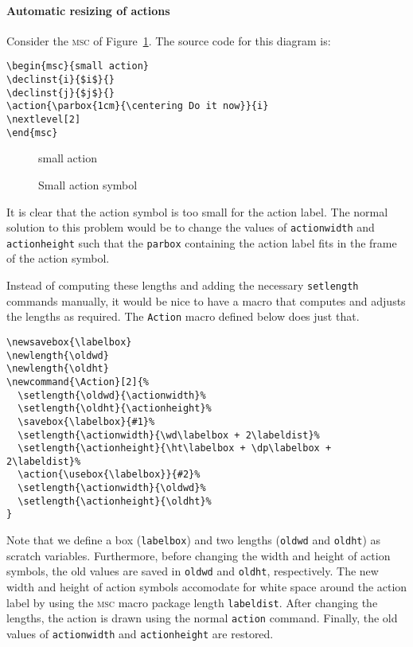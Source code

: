 \documentclass[a4paper]{article}
\newcommand{\cmd}[1]{\texttt{\bslash #1}}
\newcommand{\acro}[1]{{\scshape\lowercase{#1}}}
\newcommand\MSC{\acro{MSC}}
\newcommand{\mscpack}{\MSC{} macro package}
\begin{document}
\paragraph{Automatic resizing of actions}

Consider the \MSC{} of Figure~\ref{fig:small:action}. The source code
for this diagram is:
{
\small
\begin{verbatim}
\begin{msc}{small action}
\declinst{i}{$i$}{}
\declinst{j}{$j$}{}
\action{\parbox{1cm}{\centering Do it now}}{i}
\nextlevel[2]
\end{msc}
\end{verbatim}
}

\begin{figure}[htb]
\begin{center}
\begin{msc}{small action}
\nextlevel[2]
\end{msc}
\end{center}

\caption{Small action symbol}
\label{fig:small:action}
\end{figure}

It is clear that the action symbol is too small for the action
label. The normal solution to this problem would be to change the
values of \cmd{actionwidth} and \cmd{actionheight} such that the
\cmd{parbox} containing the action label fits in the frame of the
action symbol.

Instead of computing these lengths and adding the necessary
\cmd{setlength} commands manually, it would be nice to have a macro
that computes and adjusts the lengths as required. The \cmd{Action} macro
defined below does just that.
{
\small
\begin{verbatim}
\newsavebox{\labelbox}
\newlength{\oldwd}
\newlength{\oldht}
\newcommand{\Action}[2]{%
  \setlength{\oldwd}{\actionwidth}%
  \setlength{\oldht}{\actionheight}%
  \savebox{\labelbox}{#1}%
  \setlength{\actionwidth}{\wd\labelbox + 2\labeldist}%
  \setlength{\actionheight}{\ht\labelbox + \dp\labelbox + 2\labeldist}%
  \action{\usebox{\labelbox}}{#2}%
  \setlength{\actionwidth}{\oldwd}%
  \setlength{\actionheight}{\oldht}%
}
\end{verbatim}
} Note that we define a box (\cmd{labelbox}) and two lengths
(\cmd{oldwd} and \cmd{oldht}) as scratch variables. Furthermore,
before changing the width and height of action symbols, the old values
are saved in \cmd{oldwd} and \cmd{oldht}, respectively. The new width
and height of action symbols accomodate for white space around the
action label by using the \mscpack{} length \cmd{labeldist}.  After
changing the lengths, the action is drawn using the normal
\cmd{action} command. Finally, the old values of \cmd{actionwidth} and
\cmd{actionheight} are restored.
\end{document}

